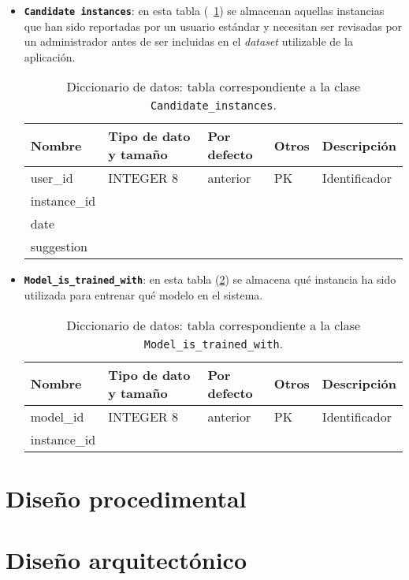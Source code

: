 \begin{itemize}
	\item \textbf{\texttt{Candidate instances}}: en esta tabla (~\ref{datadic:candidate_instances}) se almacenan aquellas instancias que han sido reportadas por un usuario estándar y necesitan ser revisadas por un administrador antes de ser incluidas en el \textit{dataset} utilizable de la aplicación.
	
		\begin{table}
		\small
		\begin{centering}
			\begin{tabular}{@{}p{6em} p{6em} p{6em} p{6em} p{6em}@{}}
				\toprule
				\textbf{Nombre} & \textbf{Tipo de dato y tamaño} & \textbf{Por defecto}& \textbf{Otros} & \textbf{Descripción}\\
				\midrule
				user\_id & INTEGER 8 & anterior & PK & Identificador \\
				instance\_id &  &  &  &  \\
				date &  &  &  &   \\
				suggestion &  &  &  &   \\
				\bottomrule
			\end{tabular}
		\end{centering}
		\caption[Diccionario de datos: Candidate\_instances]{Diccionario de datos: tabla correspondiente a la clase \texttt{Candidate\_instances}.}
		\label{datadic:candidate_instances}
		\end{table}

	\item \textbf{\texttt{Model\_is\_trained\_with}}: en esta tabla (\ref{datadic:modeltrainedwith}) se almacena qué instancia ha sido utilizada para entrenar qué modelo en el sistema.
	
		\begin{table}
		\small
		\begin{centering}
			\begin{tabular}{@{}p{6em} p{6em} p{6em} p{6em} p{6em}@{}}
				\toprule
				\textbf{Nombre} & \textbf{Tipo de dato y tamaño} & \textbf{Por defecto}& \textbf{Otros} & \textbf{Descripción}\\
				\midrule
				model\_id & INTEGER 8 & anterior & PK & Identificador \\
				instance\_id &  &  &  &  \\
				\bottomrule
			\end{tabular}
		\end{centering}
		\caption[Diccionario de datos: Model\_is\_trained\_with]{Diccionario de datos: tabla correspondiente a la clase \texttt{Model\_is\_trained\_with}.}
		\label{datadic:modeltrainedwith}
	\end{table}
\end{itemize}

\section{Diseño procedimental}

\section{Diseño arquitectónico}


